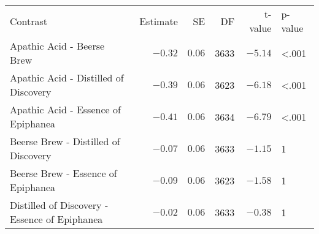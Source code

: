 \begin{longtable}{>{\raggedright\arraybackslash}p{180px}rrrrl}
\caption*{
{\large Contrast Results} \\ 
{\small Estimated Marginal Means Contrasts}
} \\ 
\toprule
Contrast & Estimate & SE & DF & t-value & p-value \\ 
\midrule\addlinespace[2.5pt]
Apathic Acid - Beerse Brew & $-0.32$ & $0.06$ & 3633 & $-5.14$ & <.001 \\ 
Apathic Acid - Distilled of Discovery & $-0.39$ & $0.06$ & 3623 & $-6.18$ & <.001 \\ 
Apathic Acid - Essence of Epiphanea & $-0.41$ & $0.06$ & 3634 & $-6.79$ & <.001 \\ 
Beerse Brew - Distilled of Discovery & $-0.07$ & $0.06$ & 3633 & $-1.15$ & 1 \\ 
Beerse Brew - Essence of Epiphanea & $-0.09$ & $0.06$ & 3623 & $-1.58$ & 1 \\ 
Distilled of Discovery - Essence of Epiphanea & $-0.02$ & $0.06$ & 3633 & $-0.38$ & 1 \\ 
\bottomrule
\end{longtable}

